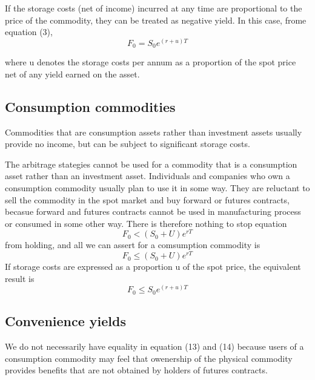\documentclass{article}
\begin{document}
If the storage costs (net of income) incurred at any time are proportional to the price of the commodity, they can be treated as negative yield. In this case, frome equation (3),
\begin{equation}
	F_0=S_0e^{(r+u)T}
\end{equation}

where u denotes the storage costs per annum as a proportion of the spot price net of any yield earned on the asset.

\subsection{Consumption commodities}
Commodities that are consumption assets rather than investment assets usually provide no income, but can be subject to significant storage costs. 

The arbitrage stategies cannot be used for a commodity that is a consumption asset rather than an investment asset. Individuals and companies who own a consumption commodity usually plan to use it in some way. They are reluctant to sell the commodity in the spot market and buy forward or futures contracts, becasue forward and futures contracts cannot be used in manufacturing process or consumed in some other way. There is therefore nothing to stop equation
\begin{equation}
	F_0<(S_0+U)e^{rT}
\end{equation}
from holding, and all we can assert for a comsumption commodity is 
\begin{equation}
	F_0\le (S_0+U)e^{rT}
\end{equation}
If storage costs are expressed as a proportion u of the spot price, the equivalent result is
\begin{equation}
	F_0\le S_0e^{(r+u)T}
\end{equation}

\subsection{Convenience yields}
We do not necessarily have equality in equation (13) and (14) because users of a consumption commodity may feel that owenership of the physical commodity provides benefits that are not obtained by holders of futures contracts.
\end{document}

